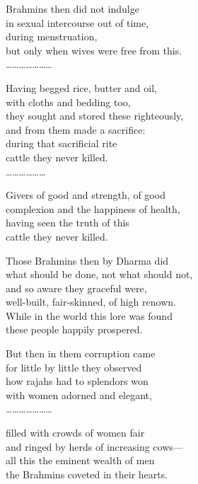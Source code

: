 \begin{myquote}
\newpage

Brahmins then did not indulge\\ in sexual intercourse out of time,\\ during menstruation,\\ but only when wives were free from this.\\ …………………

\vspace{0.05cm}

Having begged rice, butter and oil,\\ with cloths and bedding too,\\ they sought and stored these righteously,\\ and from them made a sacrifice:\\ during that sacrificial rite\\ cattle they never killed.\\ ………………

\vspace{0.05cm}

Givers of good and strength, of good\\ complexion and the happiness of health,\\ having seen the truth of this\\ cattle they never killed.

\vspace{0.05cm}

Those Brahmins then by Dharma did\\ what should be done, not what should not,\\ and so aware they graceful were,\\ well-built, fair-skinned, of high renown.\\ While in the world this lore was found\\ these people happily prospered.

But then in them corruption came\\ for little by little they observed\\ how rajahs had to splendors won\\ with women adorned and elegant,\\ …………………

\vspace{0.05cm}

 filled with crowds of women fair\\ and ringed by herds of increasing cows—\\ all this the eminent wealth of men\\ the Brahmins coveted in their hearts.


\end{myquote}
